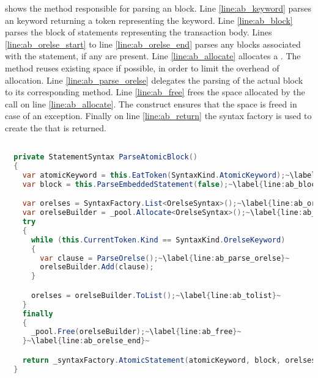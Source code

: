  shows the  method responsible for parsing an  block. Line \ref{line:ab_keyword} parses an  keyword returning a token representing the keyword. Line \ref{line:ab_block} parses the block of statements representing the transaction body. Lines \ref{line:ab_orelse_start} to line \ref{line:ab_orelse_end} parses any  blocks associated with the  statement, if any are present. Line \ref{line:ab_allocate} allocates a . The  method reuses existing space if possible, in order to limit the overhead of allocation. Line \ref{line:ab_parse_orelse} delegates the parsing of the actual  block to its corresponding method. Line \ref{line:ab_free} frees the space allocated by the call on line \ref{line:ab_allocate}. The  construct ensures that the space is freed in case of an exception. Finally on line \ref{line:ab_return} the syntax factory is used to create the  that is returned.

\begin{lstlisting}[label=lst:parse_atomic_block,
  caption={Method for parsing \bscode{atomic} block},
  language=Java,  
  showspaces=false,
  showtabs=false,
  breaklines=true,
  showstringspaces=false,
  breakatwhitespace=true,
  commentstyle=\color{greencomments},
  keywordstyle=\color{bluekeywords},
  stringstyle=\color{redstrings},
  escapechar=~,
  morekeywords={atomic, retry, orElse, var, get, set}]  % Start your code-block

  private StatementSyntax ParseAtomicBlock()
  { 
    var atomicKeyword = this.EatToken(SyntaxKind.AtomicKeyword);~\label{line:ab_keyword}~
    var block = this.ParseEmbeddedStatement(false);~\label{line:ab_block}~

    var orelses = SyntaxFactory.List<OrelseSyntax>();~\label{line:ab_orelse_start}~
    var orelseBuilder = _pool.Allocate<OrelseSyntax>();~\label{line:ab_allocate}~
    try
    {
      while (this.CurrentToken.Kind == SyntaxKind.OrelseKeyword)
      {
        var clause = ParseOrelse();~\label{line:ab_parse_orelse}~
        orelseBuilder.Add(clause);
      }

      orelses = orelseBuilder.ToList();~\label{line:ab_tolist}~
    }
    finally
    {
      _pool.Free(orelseBuilder);~\label{line:ab_free}~
    }~\label{line:ab_orelse_end}~

    return _syntaxFactory.AtomicStatement(atomicKeyword, block, orelses);~\label{line:ab_return}~
  }
\end{lstlisting}

